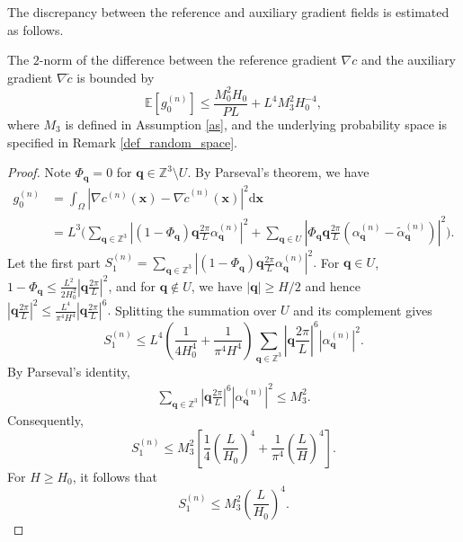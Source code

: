 \documentclass[review,onefignum,onetabnum]{siamart250211}
\begin{document}
The discrepancy between the reference and auxiliary gradient fields is estimated as follows.
\begin{lemma}
\label{lem:grad_c2}
The $2$-norm of the difference between the reference gradient \( \nabla c\) and the auxiliary gradient \( \nabla \tilde{c}\) is bounded by
\begin{equation}
\label{eq:gradc_bound2}
\mathbb{E} \left[ g_0^{(n)} \right] \leq \frac{M_0^2 H_0}{PL} + L^4 M_3^2 {H}_0^{-4},
\end{equation}
where \(M_3\) is defined in Assumption \ref{as}, and the underlying probability space is specified in Remark \ref{def_random_space}.
\end{lemma}

\begin{proof}
Note $\Phi_{\mathbf q}=0$ for $\mathbf q \in \mathbb{Z}^3 \setminus U$. By Parseval's theorem, we have
\begin{equation}
  \begin{aligned}
    g_0^{(n)}&=\int_\Omega \left| \nabla c^{(n)}(\mathbf{x}) - \nabla \tilde{c}^{(n)}(\mathbf{x}) \right|^2 \mathrm{d}\mathbf{x} \\
    &= L^3 \biggl( \sum_{\mathbf{q} \in \mathbb{Z}^3}\left|(1-\Phi_{\mathbf q})\mathbf{q}\frac{2\pi}{L} \alpha^{(n)}_{\mathbf{q}} \right|^2  + \sum_{\mathbf{q} \in U} \left| \Phi_{\mathbf q}\mathbf{q}\frac{2\pi}{L} (\alpha^{(n)}_{\mathbf{q}} - \tilde{\alpha}^{(n)}_{\mathbf{q}}) \right|^2 \biggr).
  \end{aligned}
  \label{eq:random}
\end{equation}
Let the first part
$S_1^{(n)}=\sum_{\mathbf q\in\mathbb Z^3}
\left|
(1-\Phi_{\mathbf q})
\mathbf q\frac{2\pi}{L}
\alpha_{\mathbf q}^{(n)}
\right|^2.$ For $\mathbf q\in U$, 
$1-\Phi_{\mathbf q}\leq\frac{L^2}{2H_0^2}
\left|\mathbf q\frac{2\pi}{L}\right|^2$, and for $\mathbf q\notin U$, we have $|\mathbf q|\geq H/2$ and hence
$
\left|\mathbf q\frac{2\pi}{L}\right|^2
\leq
\frac{L^4}{\pi^4H^4}
\left|\mathbf q\frac{2\pi}{L}\right|^6.$
Splitting the summation over $U$ and its complement gives
\begin{equation}
S_1^{(n)}
\leq
L^4
\left(
\frac{1}{4H_0^4}
+
\frac{1}{\pi^4H^4}
\right)
\sum_{\mathbf q\in\mathbb Z^3}
\left|\mathbf q\frac{2\pi}{L}\right|^6
|\alpha_{\mathbf q}^{(n)}|^2.
\end{equation}
By Parseval's identity,
\begin{equation}
\begin{aligned}
\sum_{\mathbf q\in\mathbb Z^3}
\left|\mathbf q\frac{2\pi}{L}\right|^6
|\alpha_{\mathbf q}^{(n)}|^2
\leq
M_3^2.
\end{aligned}
\end{equation}
Consequently,
\begin{equation}
S_1^{(n)}
\leq
M_3^2
\left[
\frac{1}{4}\left(\frac{L}{H_0}\right)^4
+
\frac{1}{\pi^4}\left(\frac{L}{H}\right)^4
\right].
\end{equation}
For $H\geq H_0$, it follows that
\begin{equation}
\label{eq:high_freq}
S_1^{(n)}
\leq
M_3^2\left(\frac{L}{H_0}\right)^4.
\end{equation}


\end{proof}
\end{document}
